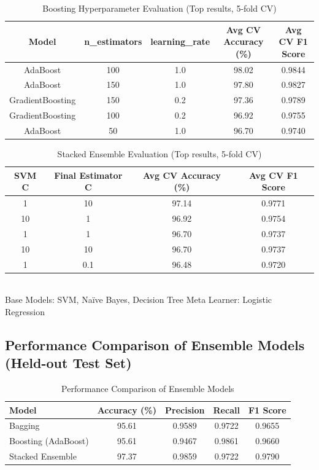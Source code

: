 \documentclass[12pt,a4paper]{article}
\begin{document}
\begin{table}[H]
\centering
\caption{Boosting Hyperparameter Evaluation (Top results, 5-fold CV)}
\begin{tabular}{ccccc}
\toprule
Model & n\_estimators & learning\_rate & Avg CV Accuracy (\%) & Avg CV F1 Score \\
\midrule
AdaBoost & 100 & 1.0 & 98.02 & 0.9844 \\
AdaBoost & 150 & 1.0 & 97.80 & 0.9827 \\
GradientBoosting & 150 & 0.2 & 97.36 & 0.9789 \\
GradientBoosting & 100 & 0.2 & 96.92 & 0.9755 \\
AdaBoost & 50  & 1.0 & 96.70 & 0.9740 \\
\bottomrule
\end{tabular}
\end{table}

\begin{table}[H]
\centering
\caption{Stacked Ensemble Evaluation (Top results, 5-fold CV)}
\begin{tabular}{cccc}
\toprule
SVM C & Final Estimator C & Avg CV Accuracy (\%) & Avg CV F1 Score \\
\midrule
1  & 10 & 97.14 & 0.9771 \\
10 & 1  & 96.92 & 0.9754 \\
1  & 1  & 96.70 & 0.9737 \\
10 & 10 & 96.70 & 0.9737 \\
1  & 0.1 & 96.48 & 0.9720 \\
\bottomrule
\end{tabular}
\\[0.3em]
\footnotesize Base Models: SVM, Na\"ive Bayes, Decision Tree \quad Meta Learner: Logistic Regression
\end{table}

\subsection*{Performance Comparison of Ensemble Models (Held-out Test Set)}

\begin{table}[H]
\centering
\caption{Performance Comparison of Ensemble Models}
\begin{tabular}{lcccc}
\toprule
Model & Accuracy (\%) & Precision & Recall & F1 Score \\
\midrule
Bagging & 95.61 & 0.9589 & 0.9722 & 0.9655 \\
Boosting (AdaBoost) & 95.61 & 0.9467 & 0.9861 & 0.9660 \\
Stacked Ensemble & 97.37 & 0.9859 & 0.9722 & 0.9790 \\
\bottomrule
\end{tabular}
\end{table}
\end{document}
